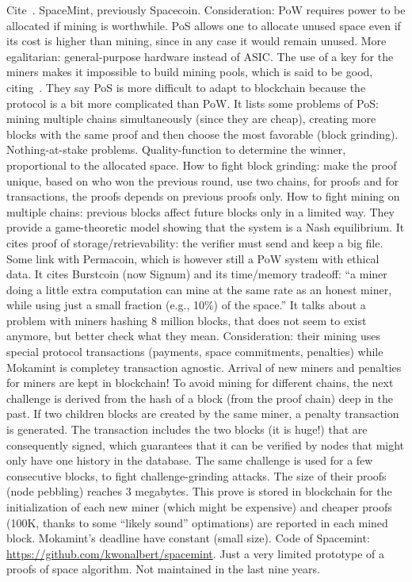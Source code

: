 Cite~\cite{ParkKFGAP18}. SpaceMint, previously Spacecoin. Consideration: PoW requires power
to be allocated if mining is worthwhile. PoS allows one to allocate unused space even if its
cost is higher than mining, since in any case it would remain unused. More egalitarian:
general-purpose hardware instead of ASIC. The use of a key for the miners makes it
impossible to build mining pools, which is said to be good, citing~\cite{MillerKKS15}.
They say PoS is more difficult to adapt to blockchain because the protocol is a bit
more complicated than PoW. It lists some problems of PoS: mining multiple chains simultaneously
(since they are cheap), creating more blocks with the same proof and then choose the most
favorable (block grinding). Nothing-at-stake problems. Quality-function to determine the winner, proportional
to the allocated space. How to fight block grinding: make the proof unique, based
on who won the previous round, use
two chains, for proofs and for transactions, the proofs depends on previous proofs only.
How to fight mining on multiple chains: previous blocks affect future blocks only in a limited way.
They provide a game-theoretic model showing that the system is a Nash equilibrium.
It cites proof of storage/retrievability: the verifier must send and keep a big file.
Some link with Permacoin, which is however still a PoW system with ethical data.
It cites Burstcoin (now Signum) and its time/memory tradeoff:
``a miner doing a little extra computation can mine at the same
rate as an honest miner, while using just a small fraction (e.g., 10\%) of the space.''
It talks about a problem with miners hashing 8 million blocks, that does not seem to exist
anymore, but better check what they mean.
Consideration: their mining uses special protocol transactions
(payments, space commitments, penalties) while Mokamint is completey transaction agnostic.
Arrival of new miners and penalties for miners are kept in blockchain!
To avoid mining for different chains, the next challenge is derived from the hash of a block
(from the proof chain) deep in the past. If two children blocks are created by the same miner,
a penalty transaction is generated. The transaction includes the two blocks (it is huge!)
that are consequently signed, which guarantees that it can be verified by nodes that might
only have one history in the database.
The same challenge is used for a few consecutive blocks, to fight challenge-grinding attacks.
The size of their proofs (node pebbling) reaches 3 megabytes. This prove is stored in blockchain
for the initialization of each new miner (which might be expensive) and cheaper proofs
(100K, thanks to some ``likely sound'' optimations) are reported in each mined block.
Mokamint's deadline have constant (small size).
Code of Spacemint: \url{https://github.com/kwonalbert/spacemint}. Just a very limited prototype of a
proofs of space algorithm. Not maintained in the last nine years.


